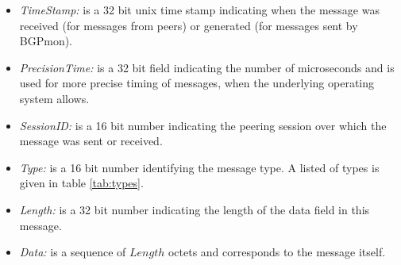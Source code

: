 \begin{itemize}
\item{\emph{TimeStamp:} is a 32 bit unix time stamp indicating when the message was received (for messages from peers) or generated (for messages sent by BGPmon).  }

\item{\emph{PrecisionTime:} is a 32 bit field indicating the number of microseconds and is used for more precise timing of messages, when the underlying operating system allows.}

\item{\emph{SessionID:} is a 16 bit number indicating the peering session over which the message was sent or received.  }   

\item{\emph{Type:} is a 16 bit number identifying the message type.    A listed of types is given in table \ref{tab:types}.}

\item{\emph{Length:} is a 32 bit number indicating the length of the data field in this message. }

\item{\emph{Data:} is a sequence of $Length$ octets and corresponds to the message itself.   }

\end{itemize}

